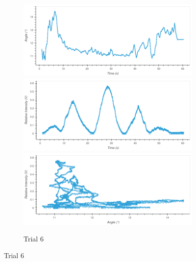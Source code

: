 \begin{figure}
\begin{subfigure}{1.0\textwidth}
\caption{Trial 6}
\includegraphics[width=\plotwidth]{plots/t7-time-angle.png}
\includegraphics[width=\plotwidth]{plots/t7-time-intensity.png}
\includegraphics[width=\plotwidth]{plots/t7-angle-intensity.png}
\end{subfigure}




\end{figure}
